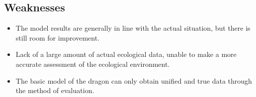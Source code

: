 \documentclass[12pt]{article}
\begin{document}
\subsection{Weaknesses}%
\begin{itemize}
    \item The model results are generally in line with the actual situation, but there is still room for improvement.
	 \item Lack of a large amount of actual ecological data, unable to make a more accurate assessment of the ecological environment.
	 \item The basic model of the dragon can only obtain unified and true data through the method of evaluation.\\\\\\\\\\\\\\\\\\\\\\\\\\\\\\\\\\\\\\\\\\\\\\\\\\\\\\\\\\\\\\\\\\\\\\\\\\\\\\\\\\
 \end{itemize}
\end{document}
